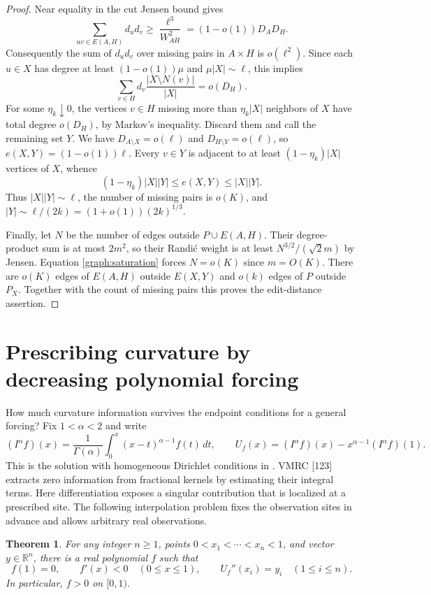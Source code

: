 \documentclass[11pt]{article}
\newtheorem{theorem}{Theorem}[section]
\theoremstyle{remark}\newtheorem{remark}[theorem]{Remark}
\begin{document}
\begin{proof}
Near equality in the cut Jensen bound gives
\[
 \sum_{uv\in E(A,H)}d_ud_v\ge\frac{\ell^3}{W_{AH}^2}
             =(1-o(1))D_A D_H.
\]
Consequently the sum of $d_ud_v$ over missing pairs in $A\times H$
is $o(\ell^2)$. Since each $u\in X$ has degree at least
$(1-o(1))\mu$ and $\mu|X|\sim\ell$, this implies
\[
 \sum_{v\in H} d_v\frac{|X\setminus N(v)|}{|X|}=o(D_H).
\]
For some $\eta_k\downarrow0$, the vertices $v\in H$ missing more than
$\eta_k |X|$ neighbors of $X$ have total degree $o(D_H)$, by Markov's
inequality. Discard them and call the remaining set $Y$. We have
$D_{A\setminus X}=o(\ell)$ and $D_{H\setminus Y}=o(\ell)$, so
$e(X,Y)=(1-o(1))\ell$. Every $v\in Y$ is adjacent to at least
$(1-\eta_k)|X|$ vertices of $X$, whence
\[
 (1-\eta_k)|X||Y|\le e(X,Y)\le |X||Y|.
\]
Thus $|X||Y|\sim\ell$, the number of missing pairs is $o(K)$,
and $|Y|\sim\ell/(2k)=(1+o(1))(2k)^{1/3}$.

Finally, let $N$ be the number of edges outside $P\cup E(A,H)$.
Their degree-product sum is at most $2m^2$, so their Randi\'c weight
is at least $N^{3/2}/(\sqrt{2}m)$ by Jensen. Equation
\eqref{graph:saturation} forces $N=o(K)$ since $m=O(K)$.
There are $o(K)$ edges of $E(A,H)$ outside $E(X,Y)$ and $o(k)$ edges
of $P$ outside $P_X$. Together with the count of missing pairs this
proves the edit-distance assertion.
\end{proof}

\clearpage
\section{Prescribing curvature by decreasing polynomial forcing}
\label{sec:interpolation}

How much curvature information survives the endpoint conditions for a general forcing?
Fix $1<\alpha<2$ and write
\[
 (I^\alpha f)(x)=\frac{1}{\Gamma(\alpha)}
    \int_0^x(x-t)^{\alpha-1} f(t)\,dt,\qquad
 U_f(x)=(I^\alpha f)(x)-x^{\alpha-1}(I^\alpha f)(1).
\]
This is the solution with homogeneous Dirichlet conditions in
\cite[eq.~(7)]{LMS}. VMRC [123] extracts zero information from fractional kernels by estimating their integral terms. Here differentiation exposes a singular contribution that is localized at a prescribed site. The following interpolation problem fixes the
observation sites in advance and allows arbitrary real observations.

\begin{theorem}\label{thm:curvature-interpolation}
For any integer $n\ge1$, points $0<x_1<\cdots<x_n<1$, and vector
$y\in\mathbb R^n$, there is a real polynomial $f$ such that
\[
 f(1)=0,\qquad f'(x)<0\quad(0\le x\le1),\qquad
 U_f''(x_i)=y_i\quad(1\le i\le n).
\]
In particular, $f>0$ on $[0,1)$.
\end{theorem}
\end{document}
